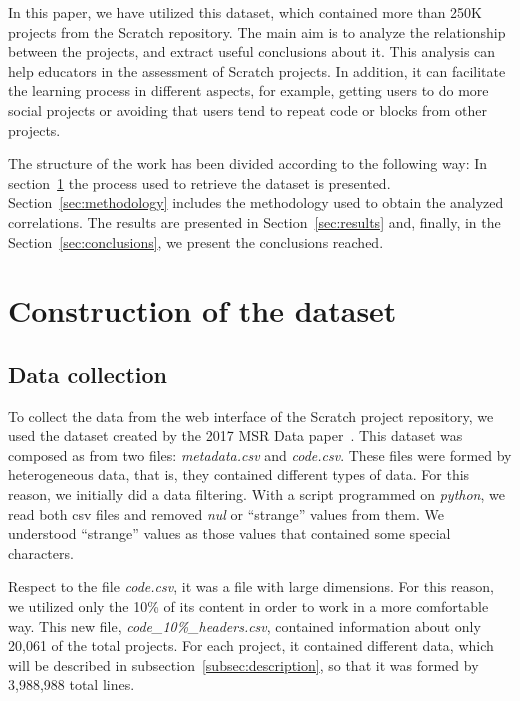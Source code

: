 \documentclass[a4paper,twocolumn,10pt]{article}
\begin{document}
In this paper, we have utilized this dataset, which contained more than 250K projects from the Scratch repository. The
main aim is to analyze the relationship between the projects, and extract useful conclusions about it. 
This analysis can help educators in the assessment of Scratch projects. In addition, it can facilitate the learning process
in different aspects, for example, getting users to do more social projects or avoiding that users tend to repeat
code or blocks from other projects.


The structure of the work has been divided according to the following way: In section~\ref{sec:construction} the process
used to retrieve the dataset is presented. Section~\ref{sec:methodology} includes the methodology used to obtain the analyzed
correlations. The results are presented in Section~\ref{sec:results} and, finally, in the Section~\ref{sec:conclusions}, we
present the conclusions reached.



\section{Construction of the dataset}
\label{sec:construction}

\subsection{Data collection}

To collect the data from the web interface of the Scratch
project repository, we used the dataset created by the 2017 MSR Data paper~\cite{aivaloglou2017dataset}.
This dataset was composed as from two files: \textit{metadata.csv} and
\textit{code.csv}. These files were formed by heterogeneous data, that is,
they contained different types of data. For this reason, we initially
did a data filtering. With a script programmed on \textit{python}, we read
both csv files and removed \textit{nul} or ``strange'' values from them.
We understood ``strange'' values as those values that contained some special
characters.

Respect to the file \textit{code.csv}, it was a file with large dimensions. 
For this reason, we utilized only the 10\% of its content in order to work in a more
comfortable way. This new file, \textit{code\_10\%\_headers.csv},
contained information about only 20,061 of the total projects. For each
project, it contained different data, which will be described in
subsection~\ref{subsec:description}, so that it was formed by 3,988,988 total lines.
\end{document}
